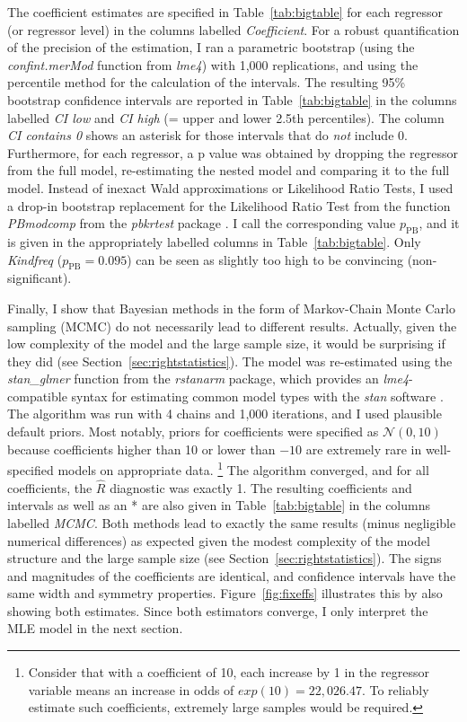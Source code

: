 \documentclass[USenglish]{article}
\newcommand{\mpPB}{\ensuremath{p_{\text{PB}}}}
\begin{document}
The coefficient estimates are specified in Table~\ref{tab:bigtable} for each regressor (or regressor level) in the columns labelled \textit{Coefficient}.
For a robust quantification of the precision of the estimation, I ran a parametric bootstrap (using the \mbox{\textit{confint.merMod}} function from \textit{lme4}) with 1,000 replications, and using the percentile method for the calculation of the intervals.
The resulting 95\% bootstrap confidence intervals are reported in Table~\ref{tab:bigtable} in the columns labelled \textit{CI low} and \textit{CI high} (= upper and lower 2.5th percentiles).
The column \textit{CI contains 0} shows an asterisk for those intervals that do \textit{not} include 0.
Furthermore, for each regressor, a p value was obtained by dropping the regressor from the full model, re-estimating the nested model and comparing it to the full model.
Instead of inexact Wald approximations or Likelihood Ratio Tests, I used a drop-in bootstrap replacement for the Likelihood Ratio Test from the function \textit{PBmodcomp} from the \textit{pbkrtest} package \citep{HalekohHojsgaard2014}.
I call the corresponding value $p_{\text{PB}}$, and it is given in the appropriately labelled columns in Table~\ref{tab:bigtable}.
Only \textit{Kindfreq} ($\mpPB=0.095$) can be seen as slightly too high to be convincing (non-significant).

Finally, I show that Bayesian methods in the form of Markov-Chain Monte Carlo sampling (MCMC) do not necessarily lead to different results.
Actually, given the low complexity of the model and the large sample size, it would be surprising if they did (see Section~\ref{sec:rightstatistics}).
The model was re-estimated using the \textit{stan\_glmer} function from the \textit{rstanarm} package, which provides an \textit{lme4}-compatible syntax for estimating common model types with the \textit{stan} software \citep{CarpenterEa2017}.
The algorithm was run with 4 chains and 1,000 iterations, and I used plausible default priors.
Most notably, priors for coefficients were specified as $\mathcal{N}(0,10)$ because coefficients higher than 10 or lower than $-10$ are extremely rare in well-specified models on appropriate data.%
\footnote{Consider that with a coefficient of 10, each increase by 1 in the regressor variable means an increase in odds of $exp(10)=22,026.47$.
To reliably estimate such coefficients, extremely large samples would be required.}
The algorithm converged, and for all coefficients, the $\hat{R}$ diagnostic was exactly 1.
The resulting coefficients and intervals as well as an * are also given in Table~\ref{tab:bigtable} in the columns labelled \textit{MCMC}.
Both methods lead to exactly the same results (minus negligible numerical differences) as expected given the modest complexity of the model structure and the large sample size (see Section~\ref{sec:rightstatistics}).
The signs and magnitudes of the coefficients are identical, and confidence intervals have the same width and symmetry properties.
Figure~\ref{fig:fixeffs} illustrates this by also showing both estimates.
Since both estimators converge, I only interpret the MLE model in the next section.
\end{document}
